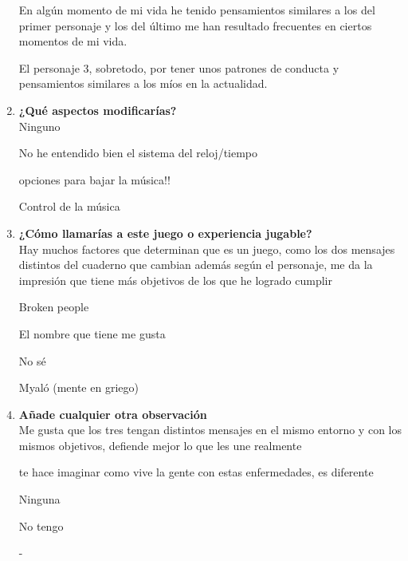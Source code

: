 \documentclass[12pt, a4paper,twoside,titlepage]{book}
\begin{document}
\begin{enumerate}[label=\textbf{\arabic*}.]
		 En algún momento de mi vida he tenido pensamientos similares a los del primer personaje y los del último me han resultado frecuentes en ciertos momentos de mi vida.
		 
		 El personaje 3, sobretodo, por tener unos patrones de conducta y pensamientos similares a los míos en la actualidad.
	 
	 \item \textbf{¿Qué aspectos modificarías? }\\	 
		 Ninguno
		 
		 No he entendido bien el sistema del reloj/tiempo
		 
		 opciones para bajar la música!!
		 
		 Control de la música
	 
	 \item \textbf{¿Cómo llamarías a este juego o experiencia jugable?}\\	 
		 Hay muchos factores que determinan que es un juego, como los dos mensajes distintos del cuaderno que cambian además según el personaje, me da la impresión que tiene más objetivos de los que he logrado cumplir
		 
		 Broken people
		 
		 El nombre que tiene me gusta
		 
		 No sé
		 
		 Myaló (mente en griego)
	 
	 \item \textbf{Añade cualquier otra observación}\\
		Me gusta que los tres tengan distintos mensajes en el mismo entorno y con los mismos objetivos, defiende mejor lo que les une realmente
		
		te hace imaginar como vive la gente con estas enfermedades, es diferente
		
		Ninguna
		
		No tengo
		
		-
	 
	
\end{enumerate}



\newpage
\end{document}
